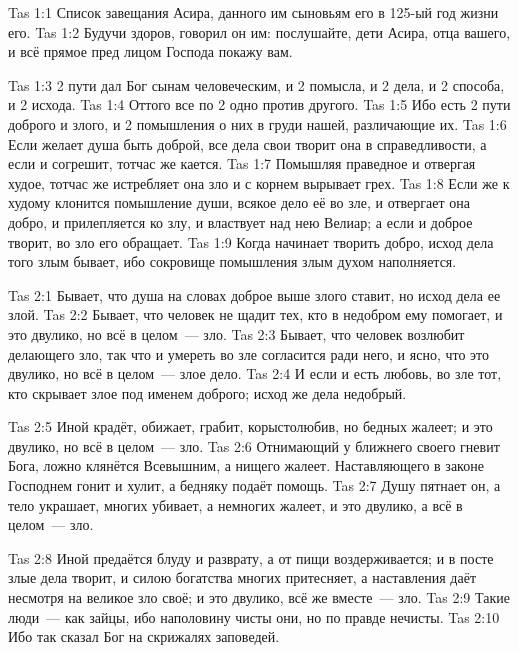 \vs Tas 1:1
Список завещания Асира, данного им сыновьям его в 125-ый год жизни его.
\vs Tas 1:2
Будучи здоров, говорил он им:
послушайте, дети Асира, отца вашего,
и всё прямое пред лицом Господа покажу вам.

\vs Tas 1:3
2 пути дал Бог сынам человеческим,
и 2 помысла, и 2 дела, и 2 способа, и 2 исхода.
\vs Tas 1:4
Оттого все по 2 одно против другого.
\vs Tas 1:5
Ибо есть 2 пути доброго и злого, и 2 помышления о них в груди нашей,
различающие их.
\vs Tas 1:6
Если желает душа быть доброй,
все дела свои творит она в справедливости,
а если и согрешит, тотчас же кается.
\vs Tas 1:7
Помышляя праведное и отвергая худое,
тотчас же истребляет она зло и с корнем вырывает грех.
\vs Tas 1:8
Если же к худому клонится помышление души,
всякое дело её во зле, и отвергает она добро,
и прилепляется ко злу, и властвует над нею Велиар;
а если и доброе творит, во зло его обращает.
\vs Tas 1:9
Когда начинает творить добро,
исход дела того злым бывает,
ибо сокровище помышления злым духом наполняется.

\vs Tas 2:1
Бывает, что душа на словах доброе выше злого ставит,
но исход дела ее злой.
\vs Tas 2:2
Бывает, что человек не щадит тех,
кто в недобром ему помогает,
и это двулико, но всё в целом~--- зло.
\vs Tas 2:3
Бывает, что человек возлюбит делающего зло,
так что и умереть во зле согласится ради него, и ясно,
что это двулико, но всё в целом~--- злое дело.
\vs Tas 2:4
И если и есть любовь, во зле тот,
кто скрывает злое под именем доброго;
исход же дела недобрый.

\vs Tas 2:5
Иной крадёт, обижает, грабит, корыстолюбив,
но бедных жалеет; и это двулико, но всё в целом~--- зло.
\vs Tas 2:6
Отнимающий у ближнего своего гневит Бога,
ложно клянётся Всевышним,
а нищего жалеет.
Наставляющего в законе Господнем гонит и хулит,
а бедняку подаёт помощь.
\vs Tas 2:7
Душу пятнает он, а тело украшает, многих убивает,
а немногих жалеет, и это двулико, а всё в целом~--- зло.

\vs Tas 2:8
Иной предаётся блуду и разврату, а от пищи воздерживается;
и в посте злые дела творит, и силою богатства многих притесняет,
а наставления даёт несмотря на великое зло своё;
и это двулико, всё же вместе~--- зло.
\vs Tas 2:9
Такие люди~--- как зайцы, ибо наполовину чисты они,
но по правде нечисты.
\vs Tas 2:10
Ибо так сказал Бог на скрижалях заповедей.

